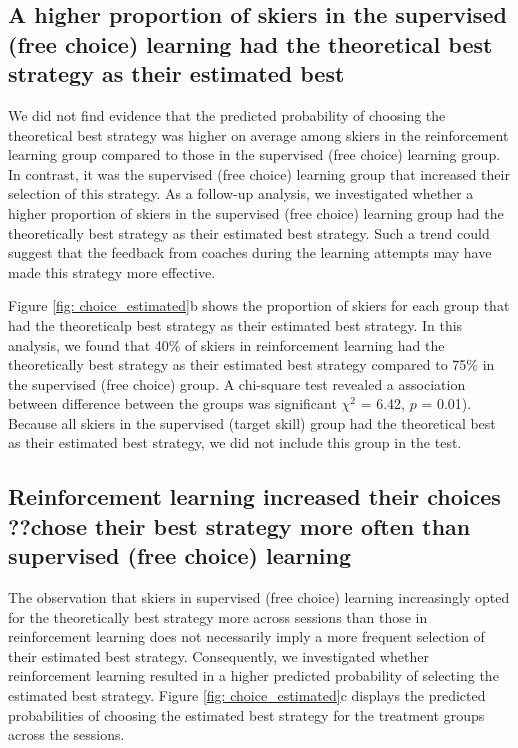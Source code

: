\documentclass{article}
\begin{document}
\subsection{A higher proportion of skiers in the supervised (free choice) learning had the theoretical best strategy as their estimated best}\label{subsubsec3}
We did not find evidence that the predicted probability of choosing the theoretical best strategy was higher on average among skiers in the reinforcement learning group compared to those in the supervised (free choice) learning group. In contrast, it was the supervised (free choice) learning group that increased their selection of this strategy. As a follow-up analysis, we investigated whether a higher proportion of skiers in the supervised (free choice) learning group had the theoretically best strategy as their estimated best strategy. Such a trend could suggest that the feedback from coaches during the learning attempts may have made this strategy more effective. 

Figure \ref{fig: choice_estimated}b shows the proportion of skiers for each group that had the theoreticalp best strategy as their estimated best strategy. In this analysis, we found that 40\% of skiers in reinforcement learning had the theoretically best strategy as their estimated best strategy compared to 75\% in the supervised (free choice) group. A chi-square test revealed a association between difference between the groups was significant $\chi^2$ = 6.42, $p$ = 0.01). Because all skiers in the supervised (target skill) group had the theoretical best as their estimated best strategy, we did not include this group in the test.  


\subsection{Reinforcement learning increased their choices ??chose their best strategy more often than supervised (free choice) learning}\label{subsubsec3}
The observation that skiers in supervised (free choice) learning increasingly opted for the theoretically best strategy more across sessions than those in reinforcement learning does not necessarily imply a more frequent selection of their estimated best strategy. Consequently, we investigated whether reinforcement learning resulted in a higher predicted probability of selecting the estimated best strategy. Figure \ref{fig: choice_estimated}c displays the predicted probabilities of choosing the estimated best strategy for the treatment groups across the sessions. 
\end{document}
